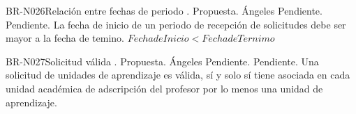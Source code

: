 \begin{BusinessRule}{BR-N026}{Relación entre fechas de periodo}
	{\bcCondition}    %
	{\btEnabler}     %
	{\blControlling}    %
	.
	\BRItem[Estado] Propuesta.
	 Ángeles
	 Pendiente.
	 Pendiente.
	\BRItem[Descripción] La fecha de inicio de un periodo de recepción de solicitudes debe ser mayor a la fecha de temino.
	\BRItem[Sentencia]  $Fecha de Inicio < Fecha de Ternimo$
\end{BusinessRule}

\begin{BusinessRule}{BR-N027}{Solicitud válida}
	{\bcCondition}    %
	{\btEnabler}     %
	{\blControlling}    %
	.
	\BRItem[Estado] Propuesta.
	 Ángeles
	 Pendiente.
	 Pendiente.
	\BRItem[Descripción] Una solicitud de unidades de aprendizaje es válida, sí y solo sí tiene asociada en cada unidad académica de adscripción del profesor por lo menos una unidad de aprendizaje.
\end{BusinessRule}

